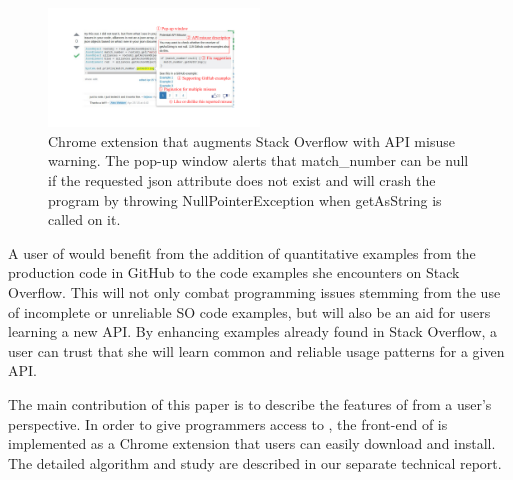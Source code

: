 \begin{figure}
\centering
\includegraphics[width=0.5\textwidth]{soap-v3.pdf}
  \vspace{.1in}
  \caption{{\tool} Chrome extension that augments Stack Overflow with API misuse warning. The pop-up window alerts that {\ttt match\_number} can be {\ttt null} if the requested json attribute does not exist and will crash the program by throwing {\ttt NullPointerException} when {\ttt getAsString} is called on it.\protect\footnotemark}
  \label{fig:screenshot}
\end{figure}


A user of {\tool} would benefit from the addition of quantitative examples from the production code in GitHub  to the code examples she encounters on Stack Overflow. This will not only combat programming issues stemming from the use of incomplete or unreliable SO code examples, but will also be an aid for users learning a new API. By enhancing examples already found in Stack Overflow, a user can trust that she will learn common and reliable usage patterns for a given API.

The main contribution of this paper is to describe the features of {\tool} from a user's perspective. In order to give programmers access to {\tool}, the front-end of {\tool} is implemented as a Chrome extension that users can easily download and install. The detailed algorithm and study are described in our separate technical report.

%
